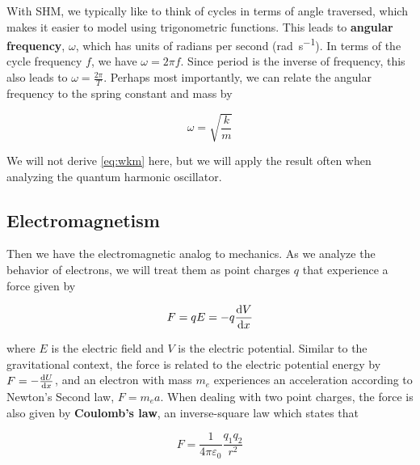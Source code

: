 With SHM, we typically like to think of cycles in terms of angle traversed, which makes it easier to model using trigonometric functions. 
This leads to \textbf{angular frequency}, $\omega$, which has units of radians per second (\si{\radian\per\second}). 
In terms of the cycle frequency $f$, we have $\omega = 2\pi f$. 
Since period is the inverse of frequency, this also leads to $\omega = \frac{2\pi}{T}$. 
Perhaps most importantly, we can relate the angular frequency to the spring constant and mass by 

\begin{tcolorbox}[title=Key Relationship] \vspace*{-2ex}
	\begin{equation}
	\omega=\sqrt{\frac{k}{m}} \label{eq:wkm}
	\end{equation}
\end{tcolorbox}

We will not derive \autoref{eq:wkm} here, but we will apply the result often when analyzing the quantum harmonic oscillator.



\subsection{Electromagnetism}

Then we have the electromagnetic analog to mechanics. 
As we analyze the behavior of electrons, we will treat them as point charges $q$ that experience a force given by 

\begin{equation*}
	F = qE = -q\dv{V}{x}
\end{equation*}

where $E$ is the electric field and $V$ is the electric potential. 
Similar to the gravitational context, the force is related to the electric potential energy by $F = -\dv{U}{x}$, and an electron with mass $m_e$ experiences an acceleration according to Newton's Second law, $F = m_ea$. 
When dealing with two point charges, the force is also given by \textbf{Coulomb's law}, an inverse-square law which states that

\begin{equation*}
	F = \frac{1}{4\pi \varepsilon_0} \frac{q_1q_2}{r^2}
\end{equation*}

